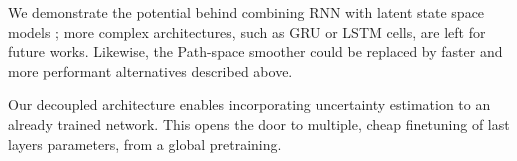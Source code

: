 \documentclass{article}
\begin{document}
We demonstrate the potential behind combining RNN with latent state space models ; more complex architectures, such as GRU or LSTM cells, are left for future works.
Likewise, the Path-space smoother could be replaced by faster and more performant alternatives described above.

Our decoupled architecture enables incorporating uncertainty estimation to an already trained network.
This opens the door to multiple, cheap finetuning of last layers parameters, from a global pretraining.







\end{document}
